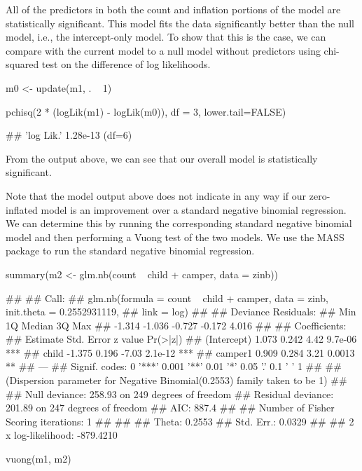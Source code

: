 All of the predictors in both the count and inflation portions of the model are statistically significant. This model fits the data significantly better than the null model, i.e., the intercept-only model. To show that this is the case, we can compare with the current model to a null model without predictors using chi-squared test on the difference of log likelihoods.



m0 <- update(m1, . ~ 1)

pchisq(2 * (logLik(m1) - logLik(m0)), df = 3, lower.tail=FALSE)
 
## 'log Lik.' 1.28e-13 (df=6)
 
From the output above, we can see that our overall model is statistically significant.
 
Note that the model output above does not indicate in any way if our zero-inflated model is an improvement over a standard negative binomial regression. We can determine this by running the corresponding standard negative binomial model and then performing a Vuong test of the two models. We use the MASS package to run the standard negative binomial regression.



summary(m2 <- glm.nb(count ~ child + camper, data = zinb))
 
## 
## Call:
## glm.nb(formula = count ~ child + camper, data = zinb, init.theta = 0.2552931119, 
##     link = log)
## 
## Deviance Residuals: 
##    Min      1Q  Median      3Q     Max  
## -1.314  -1.036  -0.727  -0.172   4.016  
## 
## Coefficients:
##             Estimate Std. Error z value Pr(>|z|)    
## (Intercept)    1.073      0.242    4.42  9.7e-06 ***
## child         -1.375      0.196   -7.03  2.1e-12 ***
## camper1        0.909      0.284    3.21   0.0013 ** 
## ---
## Signif. codes:  0 '***' 0.001 '**' 0.01 '*' 0.05 '.' 0.1 ' ' 1
## 
## (Dispersion parameter for Negative Binomial(0.2553) family taken to be 1)
## 
##     Null deviance: 258.93  on 249  degrees of freedom
## Residual deviance: 201.89  on 247  degrees of freedom
## AIC: 887.4
## 
## Number of Fisher Scoring iterations: 1
## 
## 
##               Theta:  0.2553 
##           Std. Err.:  0.0329 
## 
##  2 x log-likelihood:  -879.4210
 
vuong(m1, m2)
 
